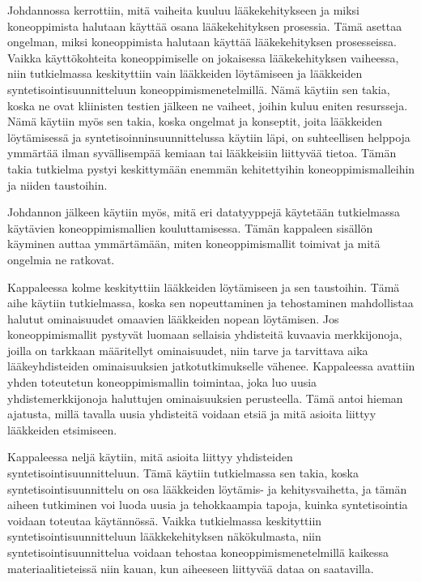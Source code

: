 \documentclass[finnish,twoside,censored,tkt,sw-line]{HYthesisML}
\begin{document}
Johdannossa kerrottiin, mitä vaiheita kuuluu lääkekehitykseen ja miksi koneoppimista halutaan käyttää osana lääkekehityksen prosessia.
Tämä asettaa ongelman, miksi koneoppimista halutaan käyttää lääkekehityksen prosesseissa.
Vaikka käyttökohteita koneoppimiselle on jokaisessa lääkekehityksen vaiheessa, niin tutkielmassa keskityttiin vain lääkkeiden löytämiseen ja lääkkeiden syntetisointisuunnitteluun koneoppimismenetelmillä.
Nämä käytiin sen takia, koska ne ovat kliinisten testien jälkeen ne vaiheet, joihin kuluu eniten resursseja.
Nämä käytiin myös sen takia, koska ongelmat ja konseptit, joita lääkkeiden löytämisessä ja syntetisoinninsuunnittelussa käytiin läpi, on suhteellisen helppoja ymmärtää ilman syvällisempää kemiaan tai lääkkeisiin liittyvää tietoa.
Tämän takia tutkielma pystyi keskittymään enemmän kehitettyihin koneoppimismalleihin ja niiden taustoihin.

Johdannon jälkeen käytiin myös, mitä eri datatyyppejä käytetään tutkielmassa käytävien koneoppimismallien kouluttamisessa.
Tämän kappaleen sisällön käyminen auttaa ymmärtämään, miten koneoppimismallit toimivat ja mitä ongelmia ne ratkovat.

Kappaleessa kolme keskityttiin lääkkeiden löytämiseen ja sen taustoihin.
Tämä aihe käytiin tutkielmassa, koska sen nopeuttaminen ja tehostaminen mahdollistaa halutut ominaisuudet omaavien lääkkeiden nopean löytämisen.
Jos koneoppimismallit pystyvät luomaan sellaisia yhdisteitä kuvaavia merkkijonoja, joilla on tarkkaan määritellyt ominaisuudet, niin tarve ja tarvittava aika lääkeyhdisteiden ominaisuuksien jatkotutkimukselle vähenee.
Kappaleessa avattiin yhden toteutetun koneoppimismallin toimintaa, joka luo uusia yhdistemerkkijonoja haluttujen ominaisuuksien perusteella.
Tämä antoi hieman ajatusta, millä tavalla uusia yhdisteitä voidaan etsiä ja mitä asioita liittyy lääkkeiden etsimiseen.

Kappaleessa neljä käytiin, mitä asioita liittyy yhdisteiden syntetisointisuunnitteluun.
Tämä käytiin tutkielmassa sen takia, koska syntetisointisuunnittelu on osa lääkkeiden löytämis- ja kehitysvaihetta, ja tämän aiheen tutkiminen voi luoda uusia ja tehokkaampia tapoja, kuinka syntetisointia voidaan toteutaa käytännössä.
Vaikka tutkielmassa keskityttiin syntetisointisuunnitteluun lääkkekehityksen näkökulmasta, niin syntetisointisuunnittelua voidaan tehostaa koneoppimismenetelmillä kaikessa materiaalitieteissä niin kauan, kun aiheeseen liittyvää dataa on saatavilla.
\end{document}
